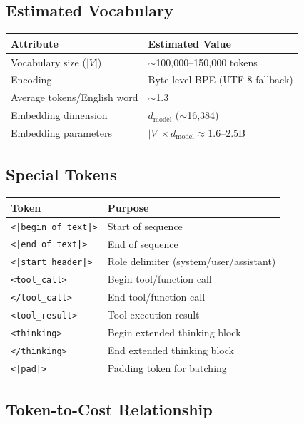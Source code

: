 \documentclass[11pt,a4paper]{article}
\begin{document}
\subsection{Estimated Vocabulary}

\begin{center}
\begin{tabular}{ll}
\toprule
\textbf{Attribute} & \textbf{Estimated Value} \\
\midrule
Vocabulary size ($|V|$) & $\sim$100,000--150,000 tokens \\
Encoding & Byte-level BPE (UTF-8 fallback) \\
Average tokens/English word & $\sim$1.3 \\
Embedding dimension & $d_{\text{model}}$ ($\sim$16,384) \\
Embedding parameters & $|V| \times d_{\text{model}} \approx 1.6\text{--}2.5$B \\
\bottomrule
\end{tabular}
\end{center}

\subsection{Special Tokens}

\begin{center}
\begin{tabular}{ll}
\toprule
\textbf{Token} & \textbf{Purpose} \\
\midrule
\texttt{<|begin\_of\_text|>} & Start of sequence \\
\texttt{<|end\_of\_text|>} & End of sequence \\
\texttt{<|start\_header|>} & Role delimiter (system/user/assistant) \\
\texttt{<tool\_call>} & Begin tool/function call \\
\texttt{</tool\_call>} & End tool/function call \\
\texttt{<tool\_result>} & Tool execution result \\
\texttt{<thinking>} & Begin extended thinking block \\
\texttt{</thinking>} & End extended thinking block \\
\texttt{<|pad|>} & Padding token for batching \\
\bottomrule
\end{tabular}
\end{center}

\subsection{Token-to-Cost Relationship}
\end{document}
